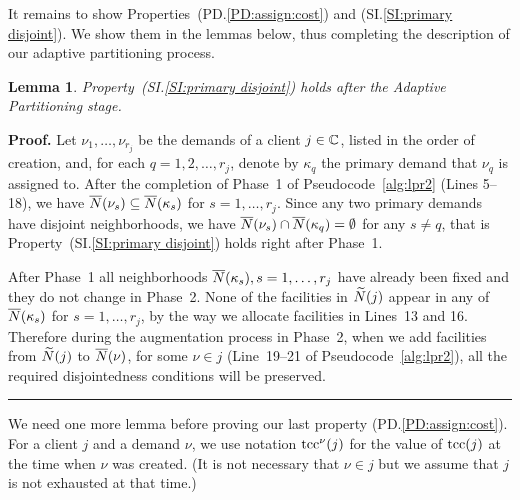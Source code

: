 \documentclass[oneside,final]{ucr}
\newtheorem{lemma}[theorem]{Lemma}
\newenvironment{proof}[1][Proof]{\textbf{#1.} }{\ \rule{0.5em}{0.5em}}
\begin{document}
It remains to show Properties~(PD.\ref{PD:assign:cost}) and
(SI.\ref{SI:primary disjoint}). We show them in the lemmas
below, thus completing the description of our adaptive
partitioning process.


\begin{lemma}\label{lem: property SI:primary disjoint holds}
  Property~(SI.\ref{SI:primary disjoint}) holds after the
  Adaptive Partitioning stage.
\end{lemma}
\begin{proof}
  Let $\nu_1,\ldots,\nu_{r_j}$ be the demands of a client
  $j\in\mathbb{C}$, listed in the order of creation, and, for each
  $q=1,2,\ldots,r_j$, denote by $\kappa_q$ the primary demand that
  $\nu_q$ is assigned to. After the completion of Phase~1 of
  Pseudocode~\ref{alg:lpr2} (Lines 5--18), we have
  ${\overline{N}}(\nu_s)\subseteq {\overline{N}}(\kappa_s)$ for  $s=1,\ldots,r_j$. 
Since any two primary demands have disjoint
  neighborhoods, we have ${\overline{N}}(\nu_s) \cap {\overline{N}}(\kappa_q) =
  \emptyset$ for any $s\neq q$, that is
	Property~(SI.\ref{SI:primary disjoint}) holds right after Phase~1.

        After Phase~1 all neighborhoods ${\overline{N}}(\kappa_s),
        s=1,\ldots,r_j$ have already been fixed and they do not change
        in Phase~2.  None of the facilities in ${\widetilde N}(j)$ appear in
        any of ${\overline{N}}(\kappa_s)$ for $s=1,\ldots,r_j$, by the way we
        allocate facilities in Lines~13 and 16.  Therefore during the
        augmentation process in Phase~2, when we add facilities from
        ${\widetilde N}(j)$ to ${\overline{N}}(\nu)$, for some $\nu\in j$
        (Line~19--21 of Pseudocode~\ref{alg:lpr2}), all the required
        disjointedness conditions will be preserved.
\end{proof}


We need one more lemma before proving our last property
(PD.\ref{PD:assign:cost}).  For a client $j$ and a demand
$\nu$, we use notation $\mbox{\rm{tcc}}^{\nu}(j)$ for the value of
$\mbox{\rm{tcc}}(j)$ at the time when $\nu$ was created. (It is not
necessary that $\nu\in j$ but we assume that $j$ is not
exhausted at that time.)
\end{document}
